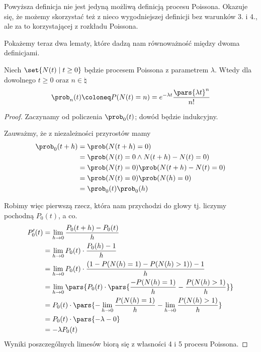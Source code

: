 Powyższa definicja nie jest jedyną możliwą definicją procesu Poissona. Okazuje się, że możemy skorzystać też z nieco wygodniejszej definicji bez warunków 3. i 4., ale za to korzystającej z rozkładu Poissona.

Pokażemy teraz dwa lematy, które dadzą nam równoważność między dwoma definicjami.

\begin{theorem}[Twierdzenie 8.7 P\&C]
	Niech \( \set{N(t) \mid t \geq 0} \) będzie procesem Poissona z parametrem \( \lambda \). Wtedy dla dowolnego \( t \geq 0 \) oraz \( n \in \natural \)
	\[
		\prob_n(t) \coloneq P(N(t) = n) = e^{-\lambda t} \frac{\pars{\lambda t}^n}{n!}
	\]
\end{theorem}

\begin{proof}
	Zaczynamy od policzenia \( \prob_0(t) \); dowód będzie indukcyjny.

	Zauważmy, że z niezależności przyrostów mamy
	\begin{align*}
		\prob_0(t+h) & = \prob(N(t+h) = 0)                         \\
		             & = \prob(N(t) = 0 \land N(t + h) - N(t) = 0) \\
		             & = \prob(N(t) = 0)\prob(N(t + h) - N(t) = 0) \\
		             & = \prob(N(t) = 0) \prob(N(h) = 0)           \\
		             & = \prob_0(t) \prob_0(h)
	\end{align*}

	Robimy więc pierwszą rzecz, która nam przychodzi do głowy tj. liczymy pochodną \( P_0(t) \), a co.
	\begin{align*}
		P_0'(t)
		 & = \lim_{h \rightarrow 0} \frac{P_0(t + h) - P_0(t)}{h}                                                             \\
		 & = \lim_{h \rightarrow 0} P_0(t) \cdot \frac{P_0(h) - 1}{h}                                                         \\
		 & = \lim_{h \rightarrow 0} P_0(t) \cdot \frac{(1 - P(N(h) = 1) - P(N(h)  > 1)) - 1}{h}                               \\
		 & = \lim_{h \rightarrow 0} \pars{ P_0(t) \cdot \pars{ \frac{- P(N(h) = 1)}{h} - \frac{P(N(h) > 1)}{h}}}              \\
		 & = P_0(t) \cdot \pars{-\lim_{h \rightarrow 0} \frac{P(N(h) = 1)}{h} - \lim_{h \rightarrow 0} \frac{P(N(h) > 1)}{h}} \\
		 & = P_0(t) \cdot \pars{-\lambda - 0}                                                                                 \\
		 & = -\lambda P_0(t)
	\end{align*}
	Wyniki poszczególnych limesów biorą się z własności 4 i 5 procesu Poissona.


\end{proof}
